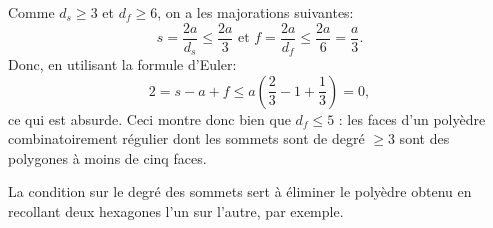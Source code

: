 \begin{exo}
\begin{sol}
Comme $d_s\geq 3$ et $d_f\geq 6$, on a les majorations suivantes:
\[ s = \frac{2a}{d_s}\leq \frac{2a}{3} \text{ et } f = \frac{2a}{d_f} \leq \frac{2a}{6} = \frac{a}{3}. \]
Donc, en utilisant la formule d'Euler:
\[ 2=s-a+f  \leq a(\frac{2}{3} - 1 + \frac{1}{3}) = 0,
\]
ce qui est absurde. Ceci montre donc bien que $d_f\leq 5$ : les faces d'un polyèdre combinatoirement régulier dont les sommets sont de degré $\geq 3$ sont des polygones à moins de cinq faces.

La condition sur le degré des sommets sert à éliminer le \og polyèdre\fg{} obtenu en recollant deux hexagones l'un sur l'autre, par exemple.

\end{sol}
\end{exo}


